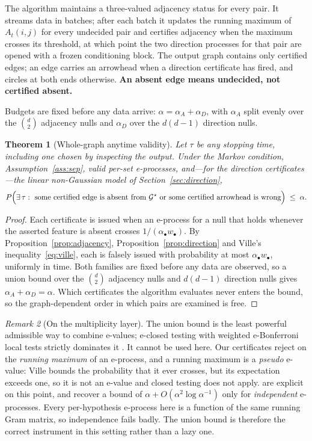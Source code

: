 \documentclass[11pt,a4paper]{article}
\newtheorem{theorem}{Theorem}
\theoremstyle{definition}
\theoremstyle{remark}
\newtheorem{remark}[theorem]{Remark}
\newcommand{\Gstar}{\mathcal{G}^{\star}}
\begin{document}
The algorithm maintains a three-valued adjacency status for every pair. It
streams data in batches; after each batch it updates the running maximum of
$A_t(i,j)$ for every undecided pair and certifies adjacency when the maximum
crosses its threshold, at which point the two direction processes for that pair
are opened with a frozen conditioning block. The output graph contains only
certified edges; an edge carries an arrowhead when a direction certificate has
fired, and circles at both ends otherwise. \textbf{An absent edge means
undecided, not certified absent.}

Budgets are fixed before any data arrive: $\alpha = \alpha_A + \alpha_D$, with
$\alpha_A$ split evenly over the $\binom{d}{2}$ adjacency nulls and $\alpha_D$
over the $d(d-1)$ direction nulls.

\begin{theorem}[Whole-graph anytime validity]
\label{thm:main}
Let $\tau$ be any stopping time, including one chosen by inspecting the output.
Under the Markov condition, Assumption~\ref{ass:sep}, valid per-set e-processes,
and---for the direction certificates---the linear non-Gaussian model of
Section~\ref{sec:direction},
\begin{equation}
P\Bigl( \exists\, \tau : \text{ some certified edge is absent from } \Gstar
  \text{ or some certified arrowhead is wrong} \Bigr) \;\le\; \alpha .
\end{equation}
\end{theorem}

\begin{proof}
Each certificate is issued when an e-process for a null that holds whenever the
asserted feature is absent crosses $1/(\alpha_\bullet w_\bullet)$. By
Proposition~\ref{prop:adjacency}, Proposition~\ref{prop:direction} and Ville's
inequality~\eqref{eq:ville}, each is falsely issued with probability at most
$\alpha_\bullet w_\bullet$, uniformly in time. Both families are fixed before
any data are observed, so a union bound over the $\binom{d}{2}$ adjacency nulls
and $d(d-1)$ direction nulls gives $\alpha_A + \alpha_D = \alpha$. Which
certificates the algorithm evaluates never enters the bound, so the
graph-dependent order in which pairs are examined is free.
\end{proof}

\begin{remark}[On the multiplicity layer]
\label{rem:multiplicity}
The union bound is the least powerful admissible way to combine e-values;
e-closed testing with weighted e-Bonferroni local tests strictly dominates it
\citep{hartog2026fwer}. It cannot be used here. Our certificates reject on the
\emph{running maximum} of an e-process, and a running maximum is a
\emph{pseudo} e-value: Ville bounds the probability that it ever crosses, but
its expectation exceeds one, so it is not an e-value and closed testing does not
apply. \citet{hartog2026fwer} are explicit on this point, and recover a bound of
$\alpha + O(\alpha^2 \log \alpha^{-1})$ only for \emph{independent} e-processes.
Every per-hypothesis e-process here is a function of the same running Gram
matrix, so independence fails badly. The union bound is therefore the correct
instrument in this setting rather than a lazy one.
\end{remark}
\end{document}

